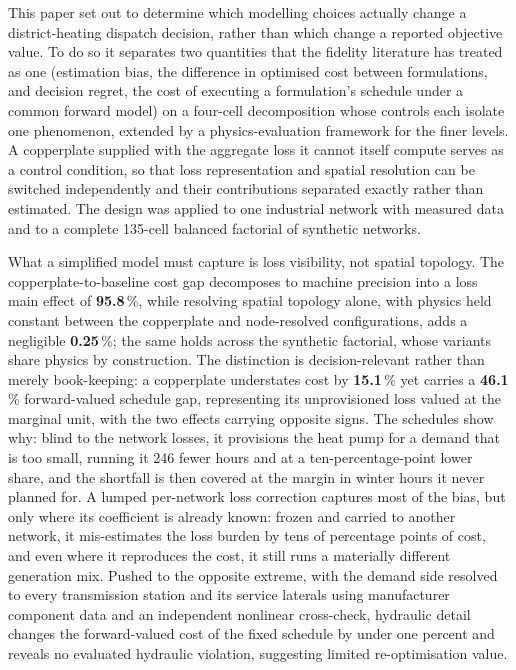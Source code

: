 
This paper set out to determine which modelling choices actually change a district-heating
dispatch decision, rather than which change a reported objective value. To do so it
separates two quantities that the fidelity literature has treated as one (estimation
bias, the difference in optimised cost between formulations, and decision regret, the cost
of executing a formulation's schedule under a common forward model) on a four-cell
decomposition whose controls each isolate one phenomenon, extended by a physics-evaluation
framework for the finer levels. A copperplate supplied with the
aggregate loss it cannot itself compute serves as a control condition, so that loss
representation and spatial resolution can be switched independently and their contributions
separated exactly rather than estimated. The design was applied to one industrial network
with measured data and to a complete 135-cell balanced factorial of synthetic networks.

What a simplified model must capture is loss visibility, not spatial topology. The
copperplate-to-baseline cost gap decomposes to machine precision into a loss main effect of
\textbf{95.8}\,\%, while resolving spatial topology alone, with physics held constant between the
copperplate and node-resolved configurations, adds a negligible \textbf{0.25}\,\%; the same holds
across the synthetic factorial, whose variants share physics by construction. The distinction is
decision-relevant rather than merely book-keeping: a copperplate understates cost by
\textbf{15.1}\,\% yet carries a \textbf{46.1}\,\% forward-valued schedule gap, representing its
unprovisioned loss valued at the marginal unit, with the two effects carrying opposite signs. The
schedules show why: blind to the network losses, it provisions the heat pump for a demand that is
too small, running it 246 fewer hours and at a ten-percentage-point lower share, and the shortfall
is then covered at the margin in winter hours it never planned for. A lumped per-network loss
correction captures most of the bias, but only where its coefficient is already known: frozen and
carried to another network, it mis-estimates the loss burden by tens of percentage points of cost,
and even where it reproduces the cost, it still runs a materially different generation mix.
Pushed to the opposite extreme, with the demand side resolved to every transmission station and
its service laterals using manufacturer component data and an independent nonlinear cross-check,
hydraulic detail changes the forward-valued cost of the fixed schedule by under one percent and reveals no evaluated hydraulic violation, suggesting limited re-optimisation value.

